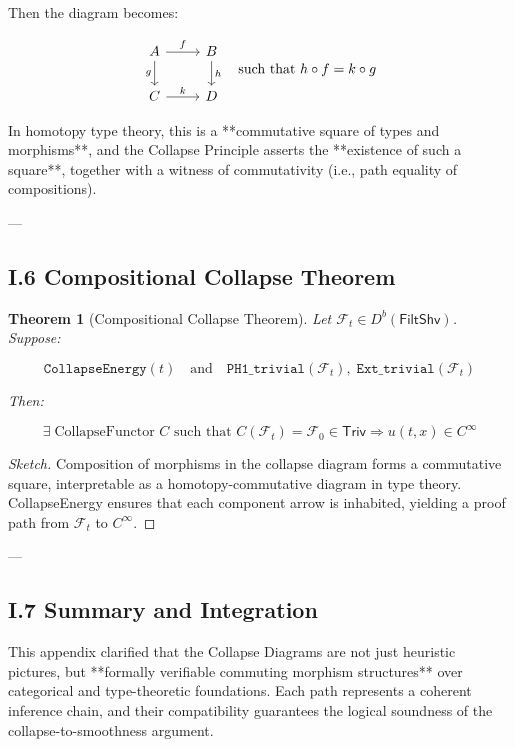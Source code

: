 \documentclass[11pt]{article}
\newtheorem{theorem}{Theorem}[section]
\begin{document}
{{Then the diagram becomes:

\[
\begin{tikzcd}
A \arrow[r, "f"] \arrow[d, "g"']
& B \arrow[d, "h"] \\
C \arrow[r, "k"]
& D
\end{tikzcd}
\quad \text{such that } h \circ f = k \circ g
\]

In homotopy type theory, this is a **commutative square of types and morphisms**,  
and the Collapse Principle asserts the **existence of such a square**,  
together with a witness of commutativity (i.e., path equality of compositions).

---

\subsection*{I.6 Compositional Collapse Theorem}

\begin{theorem}[Compositional Collapse Theorem]
Let \( \mathcal{F}_t \in D^b(\mathsf{FiltShv}) \).  
Suppose:

\[
\texttt{CollapseEnergy}(t) \quad \text{and} \quad \texttt{PH1\_trivial}(\mathcal{F}_t), \; \texttt{Ext\_trivial}(\mathcal{F}_t)
\]

Then:

\[
\exists \; \text{CollapseFunctor } C \text{ such that } C(\mathcal{F}_t) = \mathcal{F}_0 \in \mathsf{Triv}
\Rightarrow u(t,x) \in C^\infty
\]
\end{theorem}

\begin{proof}[Sketch]
Composition of morphisms in the collapse diagram forms a commutative square,  
interpretable as a homotopy-commutative diagram in type theory.  
CollapseEnergy ensures that each component arrow is inhabited,  
yielding a proof path from \( \mathcal{F}_t \) to \( C^\infty \).
\end{proof}

---

\subsection*{I.7 Summary and Integration}

This appendix clarified that the Collapse Diagrams are not just heuristic pictures,  
but **formally verifiable commuting morphism structures** over categorical and type-theoretic foundations.  
Each path represents a coherent inference chain, and their compatibility guarantees  
the logical soundness of the collapse-to-smoothness argument.

}}
\end{document}

